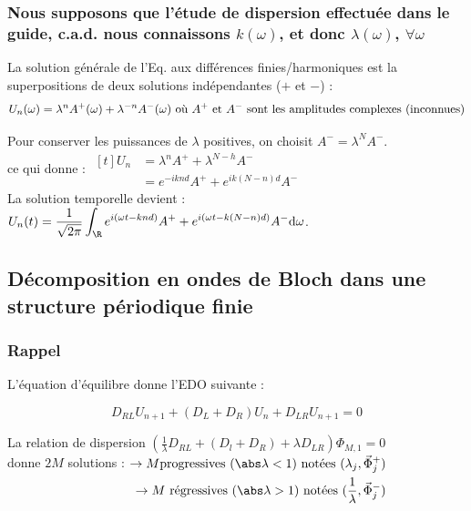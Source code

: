 \documentclass[12pt,a4paper]{article}
\begin{document}
\subsubsection{Nous supposons que l'étude de dispersion effectuée dans le guide, c.a.d. nous connaissons $k(\omega)$, et donc $\lambda(\omega)$, $\forall \omega$}
	
La solution générale de l'Eq. aux différences finies/harmoniques est la superpositions de deux solutions indépendantes ($+$ et $-$) :
\[
U_n(\omega) = \lambda^n A^+(\omega) + \lambda^{-n}A^-(\omega) \text{ où $ A^+$ et $A^-$ sont les amplitudes complexes (inconnues)}
\]

Pour conserver les puissances de $\lambda$ positives, on choisit $A^- = \lambda^N A^-$.\\
ce qui donne : $\begin{aligned}[t]
	U_n &= \lambda^n A^+ + \lambda^{N-h} A^- \\
	&= e^{-iknd}A^+ + e^{ik(N-n)d} A^-
\end{aligned}$\\
La solution temporelle devient : $U_n(t) = \dfrac1{\sqrt{2\pi}}\displaystyle\int_\R e^{i(\omega t - knd)} A^+ + e^{i(\omega t - k(N-n)d)}A^- \mathrm d\omega$.\\



\subsection{Décomposition en ondes de Bloch dans une structure périodique finie}

\subsubsection{Rappel}
 L'équation d'équilibre donne l'EDO suivante :
 
 \[
 D_{RL} U_{n+1} + (D_L+D_R)U_n + D_{LR} U_{n+1} = 0
 \]
	
La relation de dispersion $\left(\frac1\lambda D_{RL} + (D_l+D_R) + \lambda D_{LR}\right)\Phi_{M,1} = 0$\\

donne $2M$ solutions : $\begin{aligned}[t]
	\to M \text{progressives ($\abs\lambda <1$) notées ($\lambda_j,\vec\Phi_j^+$)}\\
	\to M \text{ régressives ($\abs\lambda > 1$) notées ($\frac1\lambda, \vec\Phi_j^-$)}
\end{aligned}$\\
\end{document}

